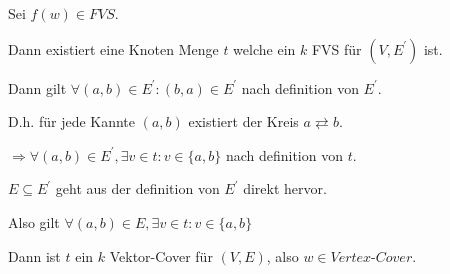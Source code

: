 Sei $f(w) \in FVS$.

Dann existiert eine Knoten Menge $t$ welche ein $k$ FVS für $(V,E^\prime)$ ist.

Dann gilt $\forall (a,b) \in E^\prime : (b,a) \in E^\prime$ nach definition von $E^\prime$.

D.h. für jede Kannte $(a,b)$ existiert der Kreis $a \rightleftarrows b$.

$\Rightarrow \forall (a,b) \in E^\prime ,\exists v \in t: v \in \{a,b\}$ nach definition von $t$.

$E \subseteq E^\prime$ geht aus der definition von $E^\prime$ direkt hervor.

Also gilt $\forall (a,b) \in E , \exists v \in t : v \in \{a,b\} $

Dann ist $t$ ein $k$ Vektor-Cover für $(V,E)$, also $w \in \textit{Vertex-Cover}$.